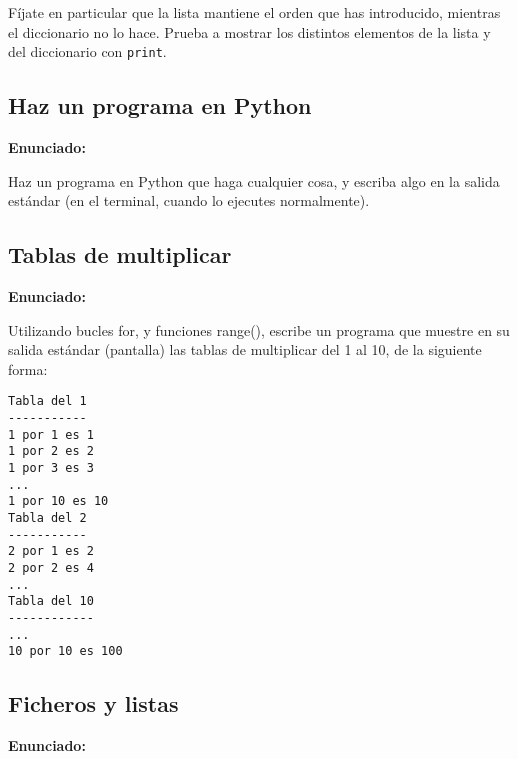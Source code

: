 Fíjate en particular que la lista mantiene el
orden que has introducido, mientras el diccionario no lo hace. Prueba a mostrar 
los distintos elementos de la lista y del diccionario con \verb|print|.

\subsection{Haz un programa en Python}
\label{subsec:eje-python-primer-programa}

\textbf{Enunciado:}

Haz un programa en Python que haga cualquier cosa, y escriba algo en la salida estándar (en el terminal, cuando lo ejecutes normalmente).


\subsection{Tablas de multiplicar}
\label{subsec:eje-python-tablas}

\textbf{Enunciado:}

Utilizando bucles for, y funciones range(), escribe un programa que muestre en su salida estándar (pantalla) las tablas de multiplicar del 1 al 10, de la siguiente forma:

\begin{verbatim}
Tabla del 1
-----------
1 por 1 es 1
1 por 2 es 2
1 por 3 es 3
...
1 por 10 es 10
Tabla del 2
-----------
2 por 1 es 2
2 por 2 es 4
...
Tabla del 10
------------
...
10 por 10 es 100
\end{verbatim}

\subsection{Ficheros y listas}
\label{subsec:ficheros-listas}

\textbf{Enunciado:}

